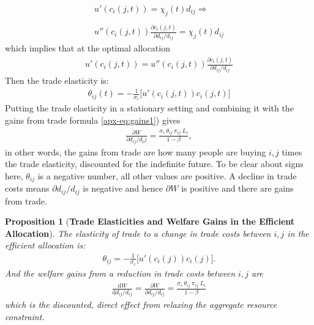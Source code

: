 \documentclass[12pt,pdftex]{article}
\newtheorem{prp}{Proposition}
\begin{document}
\begin{onehalfspacing}
\begin{align}
u'(c_{i}(j,t) ) = \chi_{j}(t) d_{ij} \Rightarrow \\
\nonumber \\
u''(c_{i}(j,t))\frac{\partial c_{i}(j,t)}{\partial d_{ij} / d_{ij}} = \chi_{j}(t)d_{ij}
\end{align}
which implies that at the optimal allocation
\begin{align}
u'(c_{i}(j,t) ) =  u''(c_{i}(j,t))\frac{\partial c_{i}(j,t)}{\partial d_{ij} / d_{ij}} \label{apx-eq:muc-fact}
\end{align}
Then the trade elasticity is:
\begin{align}
\theta_{ij}(t) =  -\frac{1}{\sigma_{\epsilon}} \bigg [ u'(c_{i}(j,t)) c_{i}(j,t) \bigg]
\end{align}
Putting the trade elasticity in a stationary setting and combining it with the gains from trade formula \ref{apx-eq:gains1}) gives
\begin{align}
\frac{\partial W}{\partial d_{ij} / d_ij} =  \frac{\sigma_{\epsilon} \ \theta_{ij} \ \pi_{ij} \ L_{i}}{1-\beta} ,
\end{align}
in other words, the gains from trade are how many people are buying $i,j$ times the trade elasticity, discounted for the indefinite future. To be clear about signs here, $\theta_{ij}$ is a negative number, all other values are positive. A decline in trade costs means $\partial d_{ij} / d_{ij}$ is negative and hence $\partial W$ is positive and there are gains from trade.

\begin{prp}[\textbf{Trade Elasticities and Welfare Gains in the Efficient Allocation}]\label{apx-prp:gains-efficient-allocation} The elasticity of trade to a change in trade costs between $i,j$ in the efficient allocation is:
\begin{align}
\theta_{ij} =  -\frac{1}{\sigma_{\epsilon}} \bigg [ u'(c_{i}(j)) c_{i}(j) \bigg]. \label{apx-eq:eff-trade-elasticity}
\end{align}
And the welfare gains from a reduction in trade costs between $i,j$ are
\begin{align}
\frac{\mathrm{d} W}{\mathrm{d} d_{ij} / d_{ij}} = \frac{\partial W}{\partial d_{ij} / d_{ij}} =  \frac{\sigma_{\epsilon} \ \theta_{ij} \ \pi_{ij} \ L_i}{1-\beta}
\label{apx-eq:eff-trade-gains}
\end{align}
which is the discounted, direct effect from relaxing the aggregate resource constraint.
\end{prp}


\end{onehalfspacing}
\end{document}

